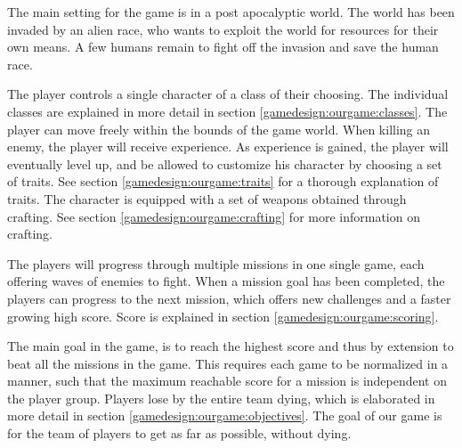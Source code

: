 
The main setting for the game is in a post apocalyptic world.
The world has been invaded by an alien race, who wants to exploit the world for resources for their own means.
A few humans remain to fight off the invasion and save the human race.

The player controls a single character of a class of their choosing. The individual classes are explained in more detail in section \ref{gamedesign:ourgame:classes}.
The player can move freely within the bounds of the game world.
When killing an enemy, the player will receive experience.
As experience is gained, the player will eventually level up, and be allowed to customize his character by choosing a set of traits. See section \ref{gamedesign:ourgame:traits} for a thorough explanation of traits.
The character is equipped with a set of weapons obtained through crafting. See section \ref{gamedesign:ourgame:crafting} for more information on crafting.

The players will progress through multiple missions in one single game, each offering waves of enemies to fight.
When a mission goal has been completed, the players can progress to the next mission, which offers new challenges and a faster growing high score. Score is explained in section \ref{gamedesign:ourgame:scoring}.

The main goal in the game, is to reach the highest score and thus by extension to beat all the missions in the game.
This requires each game to be normalized in a manner, such that the maximum reachable score for a mission is independent on the player group.
Players lose by the entire team dying, which is elaborated in more detail in section \ref{gamedesign:ourgame:objectives}.
The goal of our game is for the team of players to get as far as possible, without dying.


